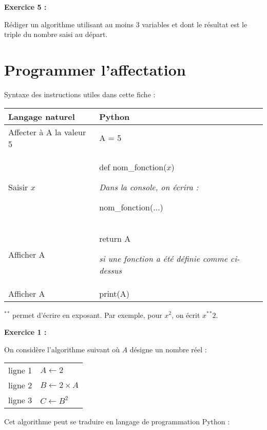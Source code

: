 \medskip

\noindent \textbf{Exercice 5 :}

Rédiger un algorithme utilisant au moins 3 variables et dont le résultat est le triple du nombre saisi au départ.

\vskip5cm

\section{Programmer l'affectation}

Syntaxe des instructions utiles dans cette fiche :

\medskip

{\renewcommand{\tabularxcolumn}[1]{%
>{\centering\arraybackslash}m{#1}}

\begin{center}
\begin{tabularx}{0.65\linewidth}{|X|X|}
\hline 
\textbf{Langage naturel} & \textbf{Python} \\ 
\hline 
Affecter à A la valeur 5 & A = 5 \\ 
\hline 
Saisir $ x $ & def nom\_{}fonction($ x $) \par \textit{Dans la console, on écrira :} \par nom\_{}fonction($ \ldots $) \\ 
\hline 
Afficher A & return A \par \textit{si une fonction a été définie comme ci-dessus} \\
\hline
Afficher A & print(A) \\
\hline
\end{tabularx}
\end{center}
}

$ ^*{}^*{} $ permet d'écrire en exposant. Par exemple, pour $ x^2 $, on écrit $ x^*{}^*{}2 $.

\textbf{Exercice 1 :}

On considère l'algorithme suivant où $ A $ désigne un nombre réel :

\medskip

\begin{tabularx}{0.2\linewidth}{|c|X|}
\hline
ligne 1 & $ A \gets 2 $ \\
ligne 2 & $ B \gets 2 \times A $ \\
ligne 3 & $ C \gets B^2 $ \\
\hline
\end{tabularx}

\medskip

Cet algorithme peut se traduire en langage de programmation Python : 

